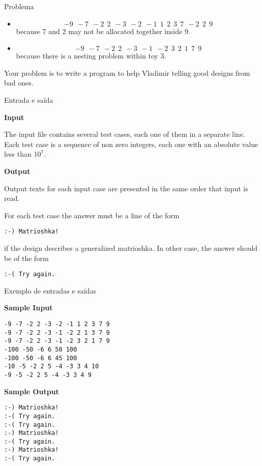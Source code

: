\begin{frame}[fragile]{Problema}
\begin{itemize}
    \item
\[
-9\ \ -7\ \ -2\ \ 2\ \ -3\ \ -2\ \ -1\ \ 1\ \ 2\ \ 3\ \ 7\ \ -2\ \ 2\ \ 9
\]
because 7 and 2 may not be allocated together inside 9.
    \item
\[
-9\ \ -7\ \ -2\ \ 2\ \ -3\ \ -1\ \ -2\ \ 3\ \ 2\ \ 1\ \ 7\ \ 9
\]
because there is a nesting problem within toy 3.
\end{itemize}

Your problem is to write a program to help Vladimir telling good designs from bad ones.
\end{frame}

\begin{frame}[fragile]{Entrada e saída}

\textbf{Input}

The input file contains several test cases, each one of them in a separate line. Each test case is a
sequence of non zero integers, each one with an absolute value less than $10^7$.

\textbf{Output}

Output texts for each input case are presented in the same order that input is read.

For each test case the answer must be a line of the form

\begin{flushleft}
\texttt{:-) Matrioshka!}
\end{flushleft}

if the design describes a generalized matrioshka. In other case, the answer should be of the form

\begin{flushleft}
\texttt{:-( Try again.}
\end{flushleft}

\end{frame}


\begin{frame}[fragile]{Exemplo de entradas e saídas}

\begin{minipage}[t]{0.6\textwidth}
\textbf{Sample Input}
\begin{verbatim}
-9 -7 -2 2 -3 -2 -1 1 2 3 7 9
-9 -7 -2 2 -3 -1 -2 2 1 3 7 9
-9 -7 -2 2 -3 -1 -2 3 2 1 7 9
-100 -50 -6 6 50 100
-100 -50 -6 6 45 100
-10 -5 -2 2 5 -4 -3 3 4 10
-9 -5 -2 2 5 -4 -3 3 4 9
\end{verbatim}
\end{minipage}
\begin{minipage}[t]{0.35\textwidth}
\textbf{Sample Output}
\begin{verbatim}
:-) Matrioshka!
:-( Try again.
:-( Try again.
:-) Matrioshka!
:-( Try again.
:-) Matrioshka!
:-( Try again.
\end{verbatim}
\end{minipage}
\end{frame}

